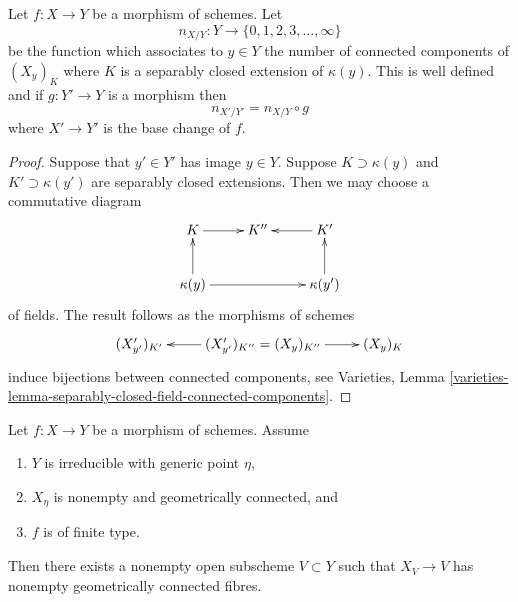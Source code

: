 \begin{lemma}
\label{lemma-base-change-fibres-nr-geometrically-connected-components}
Let $f : X \to Y$ be a morphism of schemes. Let
$$
n_{X/Y} : Y \to \{0, 1, 2, 3, \ldots, \infty\}
$$
be the function which associates to $y \in Y$ the number of connected
components of $(X_y)_K$ where $K$ is a separably closed extension
of $\kappa(y)$. This is well defined and if $g : Y' \to Y$ is a morphism
then
$$
n_{X'/Y'} = n_{X/Y} \circ g
$$
where $X' \to Y'$ is the base change of $f$.
\end{lemma}

\begin{proof}
Suppose that $y' \in Y'$ has image $y \in Y$.
Suppose $K \supset \kappa(y)$ and $K' \supset \kappa(y')$ are separably
closed extensions. Then we may choose a commutative diagram
$$
\xymatrix{
K \ar[r] & K'' & K' \ar[l] \\
\kappa(y) \ar[u] \ar[rr] & & \kappa(y') \ar[u]
}
$$
of fields. The result follows as the morphisms of schemes
$$
\xymatrix{
(X'_{y'})_{K'} &
(X'_{y'})_{K''} = (X_y)_{K''} \ar[l] \ar[r] &
(X_y)_K
}
$$
induce bijections between connected components, see
Varieties,
Lemma \ref{varieties-lemma-separably-closed-field-connected-components}.
\end{proof}

\begin{lemma}
\label{lemma-geometrically-connected-generic-fibre}
Let $f : X \to Y$ be a morphism of schemes.
Assume
\begin{enumerate}
\item $Y$ is irreducible with generic point $\eta$,
\item $X_\eta$ is nonempty and geometrically connected, and
\item $f$ is of finite type.
\end{enumerate}
Then there exists a nonempty open subscheme $V \subset Y$
such that $X_V \to V$ has nonempty geometrically connected fibres.
\end{lemma}

